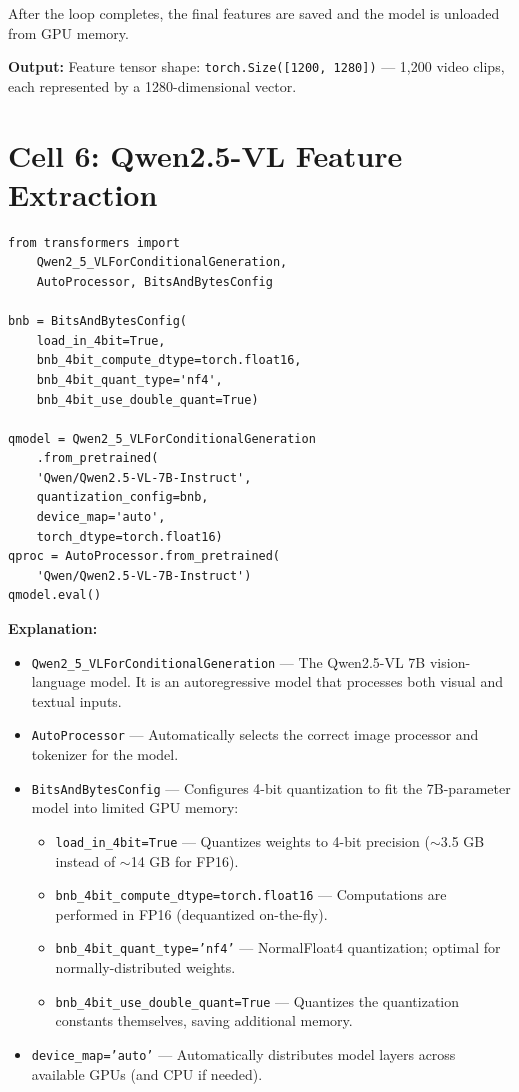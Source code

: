 \documentclass[a4paper, 12pt]{article}
\newenvironment{explanation}{%
  \par\smallskip
  \noindent\textcolor{blue!70!black}{\textbf{Explanation:}}\\
  \noindent
}{\par\medskip}
\begin{document}
After the loop completes, the final features are saved and the model is unloaded from GPU memory.

\textbf{Output:} Feature tensor shape: \texttt{torch.Size([1200, 1280])} --- 1,200 video clips, each represented by a 1280-dimensional vector.

\newpage
\section{Cell 6: Qwen2.5-VL Feature Extraction}

\begin{lstlisting}
from transformers import
    Qwen2_5_VLForConditionalGeneration,
    AutoProcessor, BitsAndBytesConfig

bnb = BitsAndBytesConfig(
    load_in_4bit=True,
    bnb_4bit_compute_dtype=torch.float16,
    bnb_4bit_quant_type='nf4',
    bnb_4bit_use_double_quant=True)

qmodel = Qwen2_5_VLForConditionalGeneration
    .from_pretrained(
    'Qwen/Qwen2.5-VL-7B-Instruct',
    quantization_config=bnb,
    device_map='auto',
    torch_dtype=torch.float16)
qproc = AutoProcessor.from_pretrained(
    'Qwen/Qwen2.5-VL-7B-Instruct')
qmodel.eval()
\end{lstlisting}

\begin{explanation}
\begin{itemize}[nosep]
  \item \texttt{Qwen2\_5\_VLForConditionalGeneration} --- The Qwen2.5-VL 7B vision-language model. It is an autoregressive model that processes both visual and textual inputs.
  \item \texttt{AutoProcessor} --- Automatically selects the correct image processor and tokenizer for the model.
  \item \texttt{BitsAndBytesConfig} --- Configures 4-bit quantization to fit the 7B-parameter model into limited GPU memory:
  \begin{itemize}[nosep]
    \item \texttt{load\_in\_4bit=True} --- Quantizes weights to 4-bit precision ($\sim$3.5 GB instead of $\sim$14 GB for FP16).
    \item \texttt{bnb\_4bit\_compute\_dtype=torch.float16} --- Computations are performed in FP16 (dequantized on-the-fly).
    \item \texttt{bnb\_4bit\_quant\_type='nf4'} --- NormalFloat4 quantization; optimal for normally-distributed weights.
    \item \texttt{bnb\_4bit\_use\_double\_quant=True} --- Quantizes the quantization constants themselves, saving additional memory.
  \end{itemize}
  \item \texttt{device\_map='auto'} --- Automatically distributes model layers across available GPUs (and CPU if needed).
\end{itemize}
\end{explanation}
\end{document}

